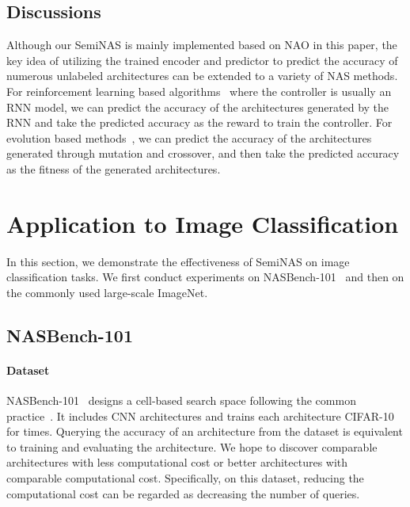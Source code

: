 \documentclass{article}
\begin{document}
\subsection{Discussions}
Although our SemiNAS is mainly implemented based on NAO in this paper, the key idea of utilizing the trained encoder  and predictor  to predict the accuracy of numerous unlabeled architectures can be extended to a variety of NAS methods. For reinforcement learning based algorithms~\cite{nas,nasnet,enas} where the controller is usually an RNN model, we can predict the accuracy of the architectures generated by the RNN and take the predicted accuracy as the reward to train the controller. For evolution based methods~\cite{amoebanet}, we can predict the accuracy of the architectures generated through mutation and crossover, and then take the predicted accuracy as the fitness of the generated architectures.

\section{Application to Image Classification}
\label{sec:image}
In this section, we demonstrate the effectiveness of SemiNAS on image classification tasks. We first conduct experiments on NASBench-101~\cite{nasbench101} and then on the commonly used large-scale ImageNet.

\subsection{NASBench-101}
\paragraph{Dataset} NASBench-101~\cite{nasbench101} designs a cell-based search space following the common practice~\cite{nasnet,nao,darts}. It includes  CNN architectures and trains each architecture CIFAR-10 for  times. Querying the accuracy of an architecture from the dataset is equivalent to training and evaluating the architecture. We hope to discover comparable architectures with less computational cost or better architectures with comparable computational cost. Specifically, on this dataset, reducing the computational cost can be regarded as decreasing the number of queries.
\end{document}
